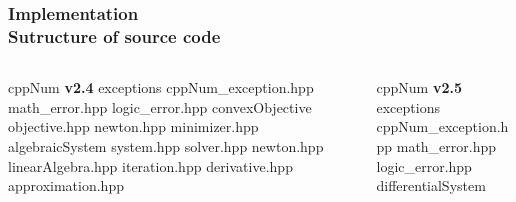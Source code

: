\documentclass[ucs,10pt]{beamer}
\begin{document}
\begin{frame}
\frametitle{Implementation \\
	\small \color{rwth-blue} Sutructure of source code}
	\begin{columns}
         	\begin{column}{0.5\textwidth}
			\setlength{\parindent}{2em}
			cppNum \textbf{v2.4} \newline
			  \indent exceptions \newline
		    	    \indent \indent cppNum\_exception.hpp \newline
		   	    \indent \indent math\_error.hpp \newline
		    	    \indent \indent logic\_error.hpp \newline
		  	  \indent convexObjective \newline
		    	    \indent \indent objective.hpp \newline
		    	    \indent \indent newton.hpp \newline
		    	    \indent \indent minimizer.hpp \newline
		  	  \indent algebraicSystem \newline
		    	    \indent \indent system.hpp \newline
		    	    \indent \indent solver.hpp \newline
		    	    \indent \indent newton.hpp \newline
		  	  \indent linearAlgebra.hpp \newline
		  	  \indent iteration.hpp \newline
		  	  \indent derivative.hpp \newline
		  	  \indent approximation.hpp \newline
		\end{column}
		\begin{column}{0.5\textwidth}
			\setlength{\parindent}{2em} \vspace{1mm} \newline
                	cppNum \textbf{v2.5} \newline
                  	  \indent exceptions \newline
                   	    \indent \indent cppNum\_exception.hpp \newline
               		    \indent \indent math\_error.hpp \newline
                	    \indent \indent logic\_error.hpp \newline
                	  \indent differentialSystem \newline

\end{column}
\end{columns}
\end{frame}
\end{document}
